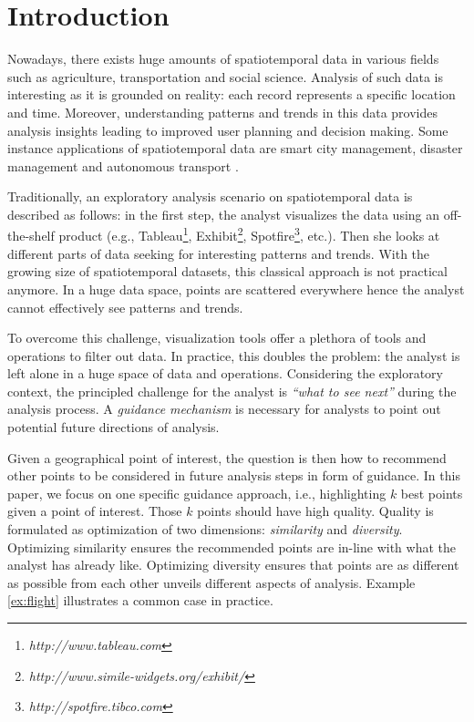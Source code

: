 \section{Introduction} 
Nowadays, there exists huge amounts of spatiotemporal data in various fields such as agriculture, transportation and social science. Analysis of such data is interesting as it is grounded
on reality: each record represents a specific location and time. Moreover, understanding patterns and trends in this data provides analysis insights leading to improved user planning and decision making. Some instance applications of spatiotemporal data are smart city management, disaster management and autonomous transport \cite{RoddickEHPS04,Telang:2012}.

Traditionally, an exploratory analysis scenario on spatiotemporal data is described as follows: in the first step, the analyst visualizes the data using an off-the-shelf product (e.g., Tableau\footnote{\it http://www.tableau.com}, Exhibit\footnote{\it http://www.simile-widgets.org/exhibit/}, Spotfire\footnote{\it http://spotfire.tibco.com}, etc.). Then she looks at different parts of data seeking for interesting patterns and trends. With the growing size of spatiotemporal datasets, this classical approach is not practical anymore. In a huge data space, points are scattered everywhere hence the analyst cannot effectively see patterns and trends.

To overcome this challenge, visualization tools offer a plethora of tools and operations to filter out data. In practice, this doubles the problem: the analyst is left alone in a huge space of data and operations. Considering the exploratory context, the principled challenge for the analyst is {\em ``what to see next''} during the analysis process. A {\em guidance mechanism} is necessary for analysts to point out potential future directions of analysis.

Given a geographical point of interest, the question is then how to recommend other points to be considered in future analysis steps in form of guidance. In this paper, we focus on one specific guidance approach, i.e., highlighting $k$ best points given a point of interest. Those $k$ points should have high quality. Quality is formulated as optimization of two dimensions: {\em similarity} and {\em diversity}. Optimizing similarity ensures the recommended points are in-line with what the analyst has already like. Optimizing diversity ensures that points are as different as possible from each other unveils different aspects of analysis. Example \ref{ex:flight} illustrates a common case in practice.

